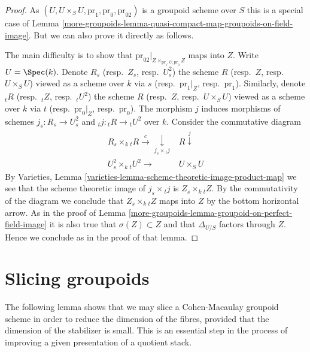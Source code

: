 \begin{proof}
As $(U, U \times_S U, \text{pr}_1, \text{pr}_0, \text{pr}_{02})$
is a groupoid scheme over $S$ this is a special case of
Lemma \ref{more-groupoids-lemma-quasi-compact-map-groupoids-on-field-image}.
But we can also prove it directly as follows.

\medskip\noindent
The main difficulty is to show that
$\text{pr}_{02}|_{Z \times_{\text{pr}_1, U, \text{pr}_0} Z}$
maps into $Z$.
Write $U = \Spec(k)$. Denote
$R_s$ (resp.\ $Z_s$, resp.\ $U^2_s$) the scheme
$R$ (resp.\ $Z$, resp.\ $U \times_S U$) viewed as a scheme over $k$ via
$s$ (resp.\ $\text{pr}_1|_Z$, resp.\ $\text{pr}_1$).
Similarly, denote
${}_tR$ (resp.\ ${}_tZ$, resp.\ ${}_tU^2$) the scheme
$R$ (resp.\ $Z$, resp.\ $U \times_S U$) viewed as a scheme over $k$ via
$t$ (resp.\ $\text{pr}_0|_Z$, resp.\ $\text{pr}_0$).
The morphism $j$ induces morphisms of schemes
$j_s : R_s \to U^2_s$ and ${}_tj : {}_tR \to {}_tU^2$ over $k$.
Consider the commutative diagram
$$
\begin{array}{cc}R_s \times_k {}_tR \overset{c}{\longrightarrow}\underset{j_s \times {}_tj}{\downarrow} & R \overset{j}{\downarrow} \\ U^2_s \times_k {}_tU^2 \longrightarrow & U \times_S U\end{array}
$$
By
Varieties, Lemma \ref{varieties-lemma-scheme-theoretic-image-product-map}
we see that the scheme theoretic image of $j_s \times {}_tj$ is
$Z_s \times_k {}_tZ$. By the commutativity of the diagram we
conclude that $Z_s \times_k {}_tZ$ maps into $Z$ by the bottom
horizontal arrow. As in the proof of
Lemma \ref{more-groupoids-lemma-groupoid-on-perfect-field-image}
it is also true that $\sigma(Z) \subset Z$ and that
$\Delta_{U/S}$ factors through $Z$. Hence we conclude as in the
proof of that lemma.
\end{proof}

\section{Slicing groupoids}
\label{more-groupoids-section-slicing}
The following lemma shows that we may slice a Cohen-Macaulay groupoid scheme
in order to reduce the dimension of the fibres, provided that the
dimension of the stabilizer is small. This is an essential step in
the process of improving a given presentation of a quotient stack.

